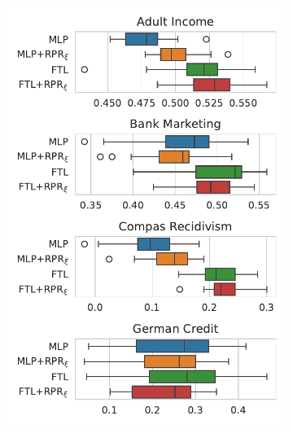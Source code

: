 \begin{figure}[!ht]
\begin{subfigure}{.32\linewidth}
    \includegraphics[width=1\linewidth]{images/boxplot_mcc_odds_rpr.pdf}
\end{subfigure}
\end{figure}

